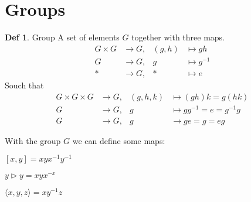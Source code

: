 \documentclass{article}
\theoremstyle{definition}
\newtheorem{definition}{Def}[section]
\theoremstyle{remark}
\begin{document}
\section{Groups}
\begin{definition}{Group} A set of elements $G$ together with three maps.
\begin{align*}
    G\times G &\longrightarrow G, & (g,h) &\longmapsto gh \\
    G &\longrightarrow G, & g &\longmapsto g^{-1} \\
    * &\longrightarrow G, & * &\longmapsto e
\end{align*}
Souch that 
\begin{align*}
    G\times G \times G &\longrightarrow G, & (g,h,k) &\longmapsto (gh)k = g(hk) \\
    G &\longrightarrow G, & g &\longmapsto gg^{-1} = e = g^{-1}g \\
    G & \longrightarrow G, & g &\longrightarrow ge = g  = eg
\end{align*}
\end{definition}
With the group $G$ we can define some maps:
\begin{description}
\item[Commutator] $[x,y] = xyx^{-1}y^{-1}$
\item[Conjucation] $y \triangleright y = xyx^{-x}$
\item $\langle x, y, z \rangle = xy^{-1}z$
\end{description}
\end{document}
